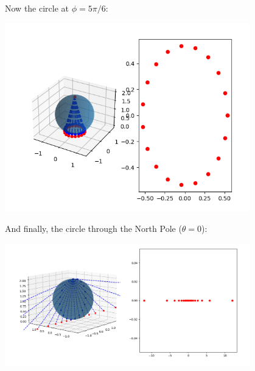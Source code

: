 \documentclass[12pt]{article}
\begin{document}
        Now the circle at $\phi = 5\pi/6$: 
        \begin{center}
        \includegraphics[width=0.8\textwidth]{Images/5pi6 latitude.png}
        \end{center}

        And finally, the circle through the North Pole ($\theta = 0$): 
        \begin{center}
        \includegraphics[width=0.8\textwidth]{Images/meridian.png}
        \end{center}
    \color{black}
\end{document}
